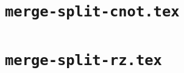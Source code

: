 \documentclass{article}
\begin{document}
\section*{\texttt{merge-split-cnot.tex}}

\clearpage
\section*{\texttt{merge-split-rz.tex}}

\clearpage
\end{document}
